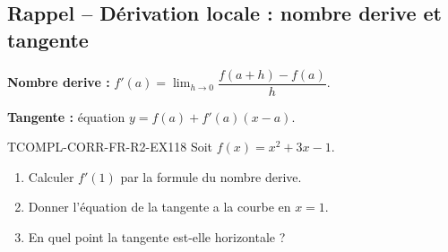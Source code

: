 

\subsection*{Rappel -- Dérivation locale : nombre derive et tangente}

\textbf{Nombre derive :} $f'(a) = \lim_{h \to 0} \dfrac{f(a+h) - f(a)}{h}$.

\textbf{Tangente :} équation $y = f(a) + f'(a)(x - a)$.

\begin{exercice}{TCOMPL-CORR-FR-R2-EX1}{1}{8}
Soit $f(x) = x^2 + 3x - 1$.
\begin{enumerate}
  \item Calculer $f'(1)$ par la formule du nombre derive.
  \item Donner l'équation de la tangente a la courbe en $x = 1$.
  \item En quel point la tangente est-elle horizontale ?
\end{enumerate}
\end{exercice}

